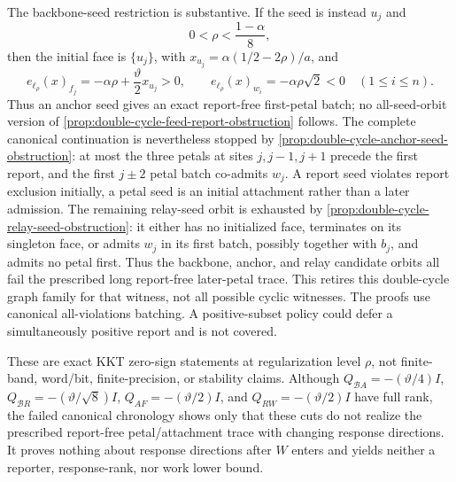 \begin{remark}
\label{rem:double-cycle-feed-trace-ledger}
The backbone-seed restriction is substantive.  If the seed is instead
$u_j$ and
\begin{equation}
 0<\rho<\frac{1-\alpha}{8},
 \label{eq:double-cycle-anchor-seed-counterrange}
\end{equation}
then the initial face is $\{u_j\}$, with
$x_{u_j}=\alpha(1/2-2\rho)/a$, and
\begin{equation*}
 e_{\ell_\rho}(x)_{f_j}
 =-\alpha\rho+\frac{\vartheta}{2}x_{u_j}>0,
 \qquad
 e_{\ell_\rho}(x)_{w_i}=-\alpha\rho\sqrt2<0
 \quad(1\leq i\leq n).
\end{equation*}
Thus an anchor seed gives an exact report-free first-petal batch; no
all-seed-orbit version of \cref{prop:double-cycle-feed-report-obstruction}
follows.  The complete canonical continuation is nevertheless stopped by
\cref{prop:double-cycle-anchor-seed-obstruction}: at most the three petals at
sites $j,j-1,j+1$ precede the first report, and the first $j\pm2$ petal batch
co-admits $w_j$.  A report seed violates
report exclusion initially, a petal seed is an initial attachment rather than
a later admission.  The remaining relay-seed orbit is exhausted by
\cref{prop:double-cycle-relay-seed-obstruction}: it either has no initialized
face, terminates on its singleton face, or admits $w_j$ in its first batch,
possibly together with $b_j$, and admits no petal first.  Thus the backbone,
anchor, and relay candidate orbits all fail the prescribed long report-free
later-petal trace.  This retires this double-cycle graph family for that
witness, not all possible cyclic witnesses.  The proofs use canonical all-violations
batching.  A positive-subset policy could defer a simultaneously positive
report and is not covered.

These are exact KKT zero-sign statements at regularization level $\rho$, not
finite-band, word/bit, finite-precision, or stability claims.  Although
$Q_{\mathcal B A}=-(\vartheta/4)I$,
$Q_{\mathcal B R}=-(\vartheta/\sqrt8)I$,
$Q_{AF}=-(\vartheta/2)I$, and
$Q_{RW}=-(\vartheta/2)I$ have full rank, the failed canonical chronology
shows only that these cuts do not realize the prescribed report-free
petal/attachment trace with changing response directions.  It proves nothing
about response directions after $W$ enters and yields neither a reporter,
response-rank, nor work lower bound.


\end{remark}
